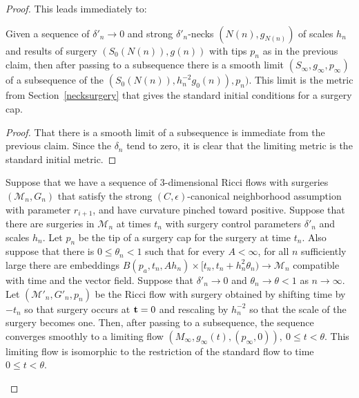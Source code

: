 \begin{proof}
This leads immediately to:

\begin{corollary}
\label{cor:surgery-cap-smooth-limit}
Given a sequence of $\delta'_n\rightarrow 0$ and strong
$\delta'_n$-necks $(N(n),g_{N(n)})$ of scales $h_n$ and results of
surgery $(S_0(N(n)),g(n))$ with tips $p_n$ as in the previous claim,
then after passing to a subsequence there is a smooth limit
$(S_\infty,g_\infty,p_\infty)$ of a subsequence of the
$(S_0(N(n)),h_n^{-2}g_0(n)),p_n)$. This limit is the metric from Section~\ref{necksurgery}
that gives the standard initial conditions for a surgery cap.
\end{corollary}

\begin{proof}
That there is a smooth limit of a subsequence is immediate from the
previous claim. Since the $\delta_n$ tend to zero, it is clear that the
limiting metric is the standard initial metric.
\end{proof}

\begin{lemma}
\label{lem:rescaled-surgery-limit-standard-flow}
Suppose that we have a sequence of $3$-dimensional Ricci flows
with surgeries $({\mathcal M}_n,G_n)$ that satisfy the strong
$(C,\epsilon)$-canonical neighborhood assumption with parameter
$r_{i+1}$, and have curvature pinched toward positive. Suppose that
there are surgeries in ${\mathcal M}_n$ at times $t_n$ with surgery
control parameters $\delta'_n$ and scales $h_n$. Let $p_n$ be the
tip of a surgery cap for the surgery at time $ t_n$. Also suppose
that there is $0\le\theta_n<1$ such that for every $A<\infty$,
for all $n$ sufficiently large
there are embeddings
$B(p_a, t_n,A h_n)\times [t_n, t_n+ h^2_n\theta_n)\to {\mathcal
M}_n$ compatible with time and the vector field. Suppose that
$\delta'_n\rightarrow 0$ and $\theta_n\rightarrow \theta<1$ as $n\rightarrow
\infty$.  Let $({\mathcal M}'_n,G'_n,p_n)$ be the Ricci flow with
surgery obtained by shifting time by $-t_n$ so that surgery occurs
at ${\bf t}=0$ and rescaling by $h_n^{-2}$ so that the scale of the
surgery becomes one. Then, after passing to a subsequence, the
sequence converges smoothly to a limiting flow
$(M_\infty,g_\infty(t),(p_\infty,0)),\ 0\le t<\theta$. This limiting flow is isomorphic to
the restriction of the standard flow to time $0\le t<\theta$.
\end{lemma}



\end{proof}
